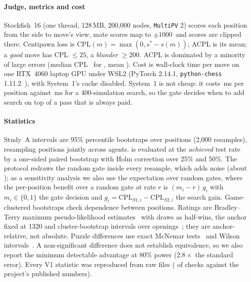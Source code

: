 \paragraph*{Judge, metrics and cost}
Stockfish~16 (one thread, 128\,MB, 200{,}000 nodes, \texttt{MultiPV} 2) scores each position from the side to move's view, mate scores map to $\pm1000$\cp\ and scores are clipped there. Centipawn loss is $\mathrm{CPL}(m)=\max(0,s^*-s(m))$; ACPL is its mean; a \emph{good} move has CPL $\le25$\cp, a \emph{blunder} $\ge200$\cp. ACPL is dominated by a minority of large errors (median CPL \medLaya\cp\ for , mean \acplLaya\cp). Cost is wall-clock time per move on one RTX~4060 laptop GPU under WSL2 (PyTorch 2.14.1, \texttt{python-chess} 1.11.2~\cite{pythonchess}), with System~1's cache disabled. System~1 is not cheap: it costs \msLayaPart\,ms per position against \msSearch\,ms for a 400-simulation search, so the gate decides when to add search on top of a pass that is always paid.

\paragraph*{Statistics}
Study~A intervals are 95\% percentile bootstraps over positions (2{,}000 resamples), resampling positions jointly across agents. \Htwo{} is evaluated at the \emph{achieved} test rate by a one-sided paired bootstrap with Holm correction over 25\% and 50\%. The protocol redraws the random gate inside every resample, which adds noise (about \randSd\cp); as a sensitivity analysis we also use the expectation over random gates, where the per-position benefit over a random gate at rate $r$ is $(m_i-r)\,g_i$ with $m_i\in\{0,1\}$ the gate decision and $g_i=\mathrm{CPL}_{S1,i}-\mathrm{CPL}_{S2,i}$ the search gain. Game-clustered bootstraps check dependence between positions. Ratings are Bradley--Terry maximum pseudo-likelihood estimates~\cite{bradley1952,hunter2004,elo1978} with draws as half-wins, the anchor fixed at 1320 and cluster-bootstrap intervals over openings~\cite{efron1979}; they are anchor-relative, not absolute. Puzzle differences use exact McNemar tests~\cite{mcnemar1947} and Wilson intervals~\cite{wilson1927}. A non-significant difference does not establish equivalence, so we also report the minimum detectable advantage at 80\% power ($2.8\times$ the standard error). Every V1 statistic was reproduced from raw files (\nChecksOk{} of \nChecks{} checks against the project's published numbers).
